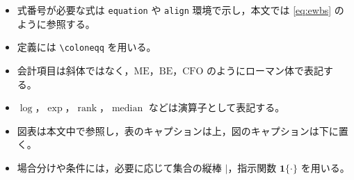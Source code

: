 \documentclass[a4paper,10pt]{article}
\newcommand{\ME}{\mathrm{ME}}
\newcommand{\BE}{\mathrm{BE}}
\newcommand{\CFO}{\mathrm{CFO}}
\newcommand{\rank}{\operatorname{rank}}
\newcommand{\median}{\operatorname{median}}
\newcommand{\1}{\mathbf{1}}
\begin{document}
\begin{itemize}[leftmargin=2em]
\item 式番号が必要な式は \texttt{equation} や \texttt{align} 環境で示し，本文では \eqref{eq:ewbs} のように参照する。
\item 定義には \texttt{\textbackslash coloneqq} を用いる。
\item 会計項目は斜体ではなく，$\ME$，$\BE$，$\CFO$ のようにローマン体で表記する。
\item $\log$，$\exp$，$\rank$，$\median$ などは演算子として表記する。
\item 図表は本文中で参照し，表のキャプションは上，図のキャプションは下に置く。
\item 場合分けや条件には，必要に応じて集合の縦棒 $\mid$，指示関数 $\1\{\cdot\}$ を用いる。
\end{itemize}
\end{document}
